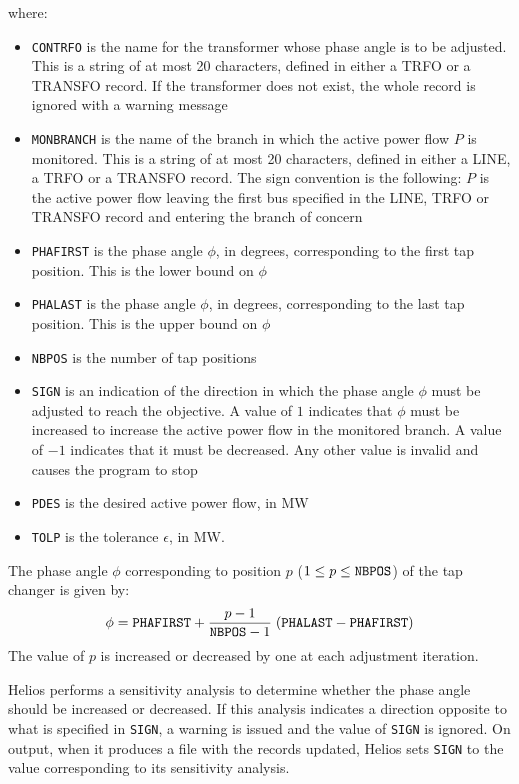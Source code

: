where:
\begin{itemize}
\item {\tt CONTRFO} is the name for the transformer whose phase angle is to be adjusted. This is a string of at most 20 characters, defined in either a TRFO or a TRANSFO record. If the transformer does
not exist, the whole record is ignored with a warning message
\item {\tt MONBRANCH} is the name of the branch in which the active power flow $P$ is
monitored. This is a string of at most 20 characters, defined in either a LINE, a TRFO or a TRANSFO record.  The sign convention is the following: $P$ is the active power flow leaving the first bus specified in the LINE, TRFO or TRANSFO record and entering the branch of concern
\item {\tt PHAFIRST} is the phase angle $\phi$, in degrees, corresponding to the first tap position. This is the lower bound on $\phi$
\item {\tt PHALAST} is the phase angle $\phi$, in degrees, corresponding to the last tap position. This is the upper bound on $\phi$
\item {\tt NBPOS} is the number of tap positions
\item {\tt SIGN} is an indication of the direction in which the phase angle $\phi$ must be adjusted to reach the objective. A value of $1$ indicates that $\phi$ must be increased to increase the active power flow in the monitored branch. A value of $-1$ indicates that it must be decreased. Any other value is invalid and causes the program to stop
\item {\tt PDES} is the desired active power flow, in MW
\item {\tt TOLP} is the tolerance $\epsilon$, in MW.
\end{itemize}

The phase angle $\phi$ corresponding to position $p$ ($1 \le p \le {\tt NBPOS}$) of the tap changer is given by:
\begin{equation}\label{equ-pf-phivalue}
\phi = {\tt PHAFIRST} + \frac{p-1}{{\tt NBPOS}-1} \; ({\tt PHALAST} - {\tt PHAFIRST})
\end{equation}
The value of $p$ is increased or decreased by one at each adjustment iteration.

Helios performs a sensitivity analysis to determine whether the phase angle should be increased or decreased. If this analysis indicates a direction opposite to what is specified in {\tt SIGN}, a warning is issued and the value of {\tt SIGN} is ignored. On output, when it produces a file with the records updated, Helios sets {\tt SIGN} to the value corresponding to its sensitivity analysis.

